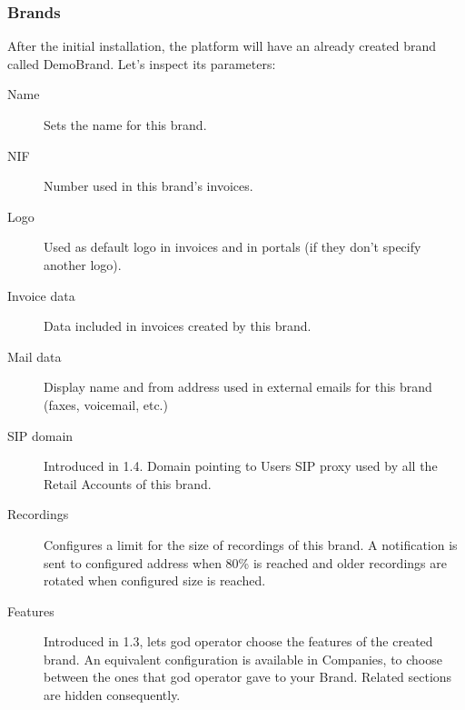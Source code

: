 \documentclass[letterpaper,10pt,english]{sphinxmanual}
\begin{document}
\subsubsection{Brands}
\label{internal_calls/god_portal:brands}
After the initial installation, the platform will have an already created brand
called DemoBrand. Let's inspect its parameters:
\begin{description}
\item[{Name}] \leavevmode{}\label{internal_calls/god_portal:term-name}
Sets the name for this brand.

\item[{NIF}] \leavevmode{}\label{internal_calls/god_portal:term-nif}
Number used in this brand's invoices.

\item[{Logo}] \leavevmode{}\label{internal_calls/god_portal:term-logo}
Used as default logo in invoices and in portals (if they don't specify
another logo).

\item[{Invoice data}] \leavevmode{}\label{internal_calls/god_portal:term-invoice-data}
Data included in invoices created by this brand.

\item[{Mail data}] \leavevmode{}\label{internal_calls/god_portal:term-mail-data}
Display name and from address used in external emails for this brand
(faxes, voicemail, etc.)

\item[{SIP domain}] \leavevmode{}\label{internal_calls/god_portal:term-sip-domain}
Introduced in 1.4. Domain pointing to Users SIP proxy used by all the
Retail Accounts of this brand.

\item[{Recordings}] \leavevmode{}\label{internal_calls/god_portal:term-recordings}
Configures a limit for the size of recordings of this brand. A
notification is sent to configured address when 80\% is reached and
older recordings are rotated when configured size is reached.

\item[{Features}] \leavevmode{}\label{internal_calls/god_portal:term-features}
Introduced in 1.3, lets god operator choose the features of the created
brand. An equivalent configuration is available in Companies, to choose
between the ones that god operator gave to your Brand. Related sections
are hidden consequently.

\end{description}
\end{document}
